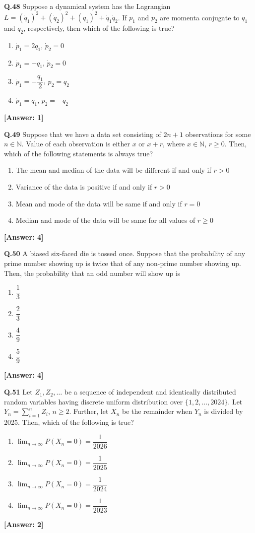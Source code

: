 \documentclass[12pt,a4paper]{article}
\newcommand{\ans}[1]{\quad\textcolor{anscolor}{\textbf{[Answer: #1]}}}
\begin{document}
\textbf{Q.48} Suppose a dynamical system has the Lagrangian $L=(\dot{q}_1)^2+(\dot{q}_2)^2+(q_1)^2+\dot{q}_1\dot{q}_2$. If $p_1$ and $p_2$ are momenta conjugate to $q_1$ and $q_2$, respectively, then which of the following is true?
\begin{enumerate}[label=\arabic*.]
\item $\dot{p}_1=2q_1$, $\dot{p}_2=0$
\item $\dot{p}_1=-q_1$, $\dot{p}_2=0$
\item $\dot{p}_1=-\dfrac{q_1}{2}$, $p_2=q_2$
\item $\dot{p}_1=q_1$, $p_2=-q_2$
\end{enumerate}\ans{1}

\textbf{Q.49} Suppose that we have a data set consisting of $2n+1$ observations for some $n\in\mathbb{N}$. Value of each observation is either $x$ or $x+r$, where $x\in\mathbb{N}$, $r\ge0$. Then, which of the following statements is always true?
\begin{enumerate}[label=\arabic*.]
\item The mean and median of the data will be different if and only if $r>0$
\item Variance of the data is positive if and only if $r>0$
\item Mean and mode of the data will be same if and only if $r=0$
\item Median and mode of the data will be same for all values of $r\ge0$
\end{enumerate}\ans{4}

\textbf{Q.50} A biased six-faced die is tossed once. Suppose that the probability of any prime number showing up is twice that of any non-prime number showing up. Then, the probability that an odd number will show up is
\begin{enumerate}[label=\arabic*.]
\item $\dfrac{1}{3}$ \item $\dfrac{2}{3}$ \item $\dfrac{4}{9}$ \item $\dfrac{5}{9}$
\end{enumerate}\ans{4}

\textbf{Q.51} Let $Z_1,Z_2,\ldots$ be a sequence of independent and identically distributed random variables having discrete uniform distribution over $\{1,2,\ldots,2024\}$. Let $Y_n=\sum_{i=1}^nZ_i$, $n\ge2$. Further, let $X_n$ be the remainder when $Y_n$ is divided by 2025. Then, which of the following is true?
\begin{enumerate}[label=\arabic*.]
\item $\lim_{n\to\infty}P(X_n=0)=\dfrac{1}{2026}$
\item $\lim_{n\to\infty}P(X_n=0)=\dfrac{1}{2025}$
\item $\lim_{n\to\infty}P(X_n=0)=\dfrac{1}{2024}$
\item $\lim_{n\to\infty}P(X_n=0)=\dfrac{1}{2023}$
\end{enumerate}\ans{2}
\end{document}
